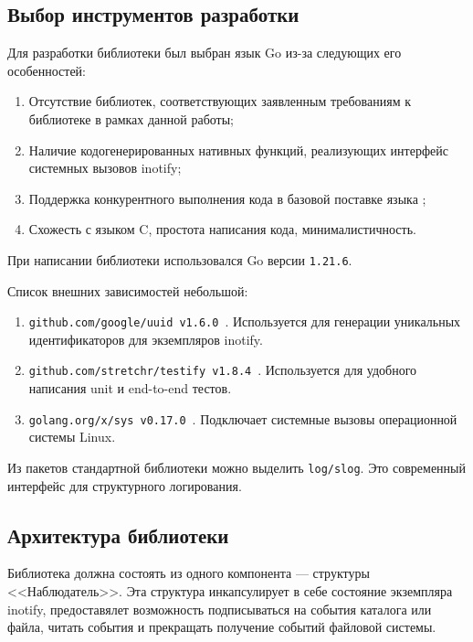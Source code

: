 \documentclass[14pt, russian]{scrartcl}
\newcommand{\code}[1]{\texttt{#1}}
\begin{document}
\subsection{Выбор инструментов разработки}

Для разработки библиотеки был выбран язык Go из-за следующих его особенностей:

\begin{enumerate}
	\item Отсутствие библиотек, соответствующих заявленным требованиям к
        библиотеке в рамках данной работы;
	\item Наличие кодогенерированных нативных функций, реализующих интерфейс
        системных вызовов inotify;
	\item Поддержка конкурентного выполнения кода в базовой поставке языка \cite{effectivego};
  \item Схожесть с языком C, простота написания кода, минималистичность.
\end{enumerate}

При написании библиотеки использовался Go версии \code{1.21.6}.

Список внешних зависимостей небольшой:

\begin{enumerate}
  \item \code{github.com/google/uuid v1.6.0}~\cite{uuid}. Используется для генерации
        уникальных идентификаторов для экземпляров inotify.
  \item \code{github.com/stretchr/testify v1.8.4}~\cite{testify}. Используется для удобного
        написания unit и end-to-end тестов.
  \item \code{golang.org/x/sys v0.17.0}~\cite{golangunix}. Подключает системные вызовы
        операционной системы Linux.
\end{enumerate}

Из пакетов стандартной библиотеки можно выделить \code{log/slog}. Это
современный интерфейс для структурного логирования.

\subsection{Архитектура библиотеки}

Библиотека должна состоять из одного компонента --- структуры <<Наблюдатель>>.
Эта структура инкапсулирует в себе состояние экземпляра inotify, предоставялет
возможность подписываться на события каталога или файла, читать события и
прекращать получение событий файловой системы.
\end{document}
